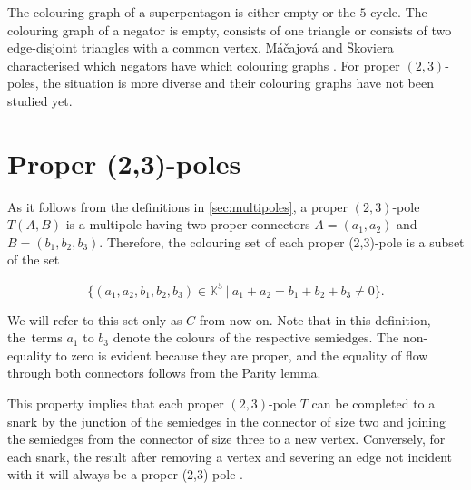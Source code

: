 The colouring graph of a superpentagon is either empty or the $5$-cycle. The colouring graph of a negator is empty, consists of one triangle or consists of two edge-disjoint triangles with a common vertex.
Máčajová and Škoviera characterised which negators have which colouring graphs \cite{IrreducibleSnarksSkoviera}.
For proper $(2,3)$-poles, the situation is more diverse and their colouring graphs have not been studied yet.





\section{Proper (2,3)-poles}\label{ch:proper-23-poles}

As it follows from the definitions in \cref{sec:multipoles}, a proper $(2,3)$-pole $T(A,B)$ is a multipole having two proper connectors $A=(a_1,a_2)$ and $B=(b_1,b_2,b_3)$. Therefore, the colouring set of each proper (2,3)-pole is a subset of the set

$$\{(a_1,a_2,b_1,b_2,b_3)\in\mathbb{K}^5~|~a_1+a_2=b_1+b_2+b_3\neq 0\}.$$

We will refer to this set only as $C$ from now on. Note that in this definition, the~terms $a_1$ to $b_3$ denote the colours of the respective semiedges. The non-equality to zero is evident because they are proper, and the equality of flow through both connectors follows from the Parity lemma.

This property implies that each proper $(2,3)$-pole $T$ can be completed to a snark by the junction of the semiedges in the connector of size two and joining the semiedges from the connector of size three to a new vertex. Conversely, for each snark, the result after removing a vertex and severing an edge not incident with it will always be a proper (2,3)-pole \cite{MorphologyOfSmall}.

